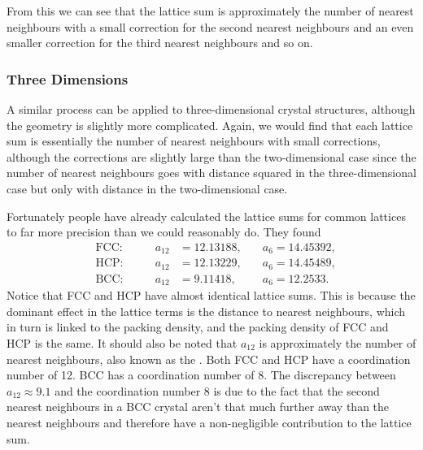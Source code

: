\documentclass[fleqn]{NotesClass}
\begin{document}
    From this we can see that the lattice sum is approximately the number of nearest neighbours with a small correction for the second nearest neighbours and an even smaller correction for the third nearest neighbours and so on.
    
    \subsubsection{Three Dimensions}
    A similar process can be applied to three-dimensional crystal structures, although the geometry is slightly more complicated.
    Again, we would find that each lattice sum is essentially the number of nearest neighbours with small corrections, although the corrections are slightly large than the two-dimensional case since the number of nearest neighbours goes with distance squared in the three-dimensional case but only with distance in the two-dimensional case.
    
    Fortunately people have already calculated the lattice sums for common lattices to far more precision than we could reasonably do.
    They found
    \begin{align}
        &\text{FCC:} \qquad & a_{12} &= 12.13188, \quad & a_{6} = 14.45392,\\
        &\text{HCP:} \qquad & a_{12} &= 12.13229, \quad & a_{6} = 14.45489,\\
        &\text{BCC:} \qquad & a_{12} &= 9.11418, \quad & a_{6} = 12.2533.
    \end{align}
    Notice that FCC and HCP have almost identical lattice sums.
    This is because the dominant effect in the lattice terms is the distance to nearest neighbours, which in turn is linked to the packing density, and the packing density of FCC and HCP is the same.
    It should also be noted that \(a_{12}\) is approximately the number of nearest neighbours, also known as the .
    Both FCC and HCP have a coordination number of 12.
    BCC has a coordination number of 8.
    The discrepancy between \(a_{12} \approx 9.1\) and the coordination number 8 is due to the fact that the second nearest neighbours in a BCC crystal aren't that much further away than the nearest neighbours and therefore have a non-negligible contribution to the lattice sum.
    
\end{document}

